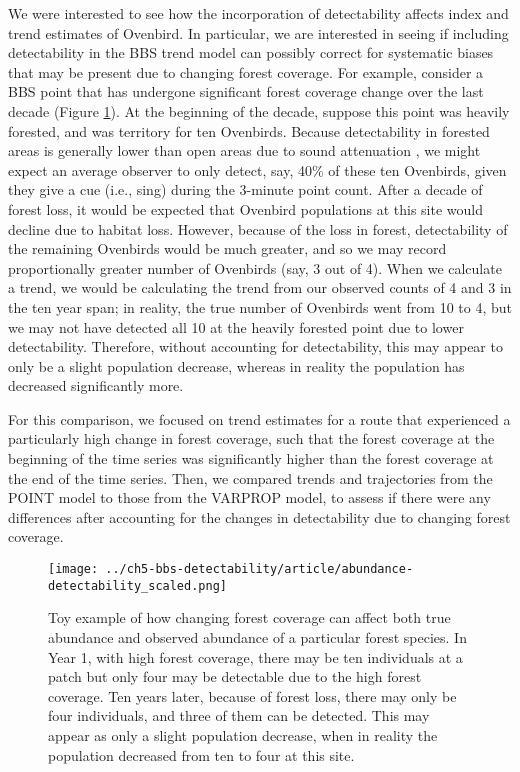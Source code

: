 \par We were interested to see how the incorporation of detectability affects index and trend estimates of Ovenbird.
In particular, we are interested in seeing if including detectability in the BBS trend model can possibly correct for systematic biases that may be present due to changing forest coverage.
For example, consider a BBS point that has undergone significant forest coverage change over the last decade (Figure \ref{fig:example}).
At the beginning of the decade, suppose this point was heavily forested, and was territory for ten Ovenbirds. 
Because detectability in forested areas is generally lower than open areas due to sound attenuation \citep{yip_sound_2017}, we might expect an average observer to only detect, say, 40\% of these ten Ovenbirds, given they give a cue (i.e., sing) during the 3-minute point count.
After a decade of forest loss, it would be expected that Ovenbird populations at this site would decline due to habitat loss.
However, because of the loss in forest, detectability of the remaining Ovenbirds would be much greater, and so we may record proportionally greater number of Ovenbirds (say, 3 out of 4).
When we calculate a trend, we would be calculating the trend from our observed counts of 4 and 3 in the ten year span; in reality, the true number of Ovenbirds went from 10 to 4, but we may not have detected all 10 at the heavily forested point due to lower detectability.
Therefore, without accounting for detectability, this may appear to only be a slight population decrease, whereas in reality the population has decreased significantly more.

\par For this comparison, we focused on trend estimates for a route that experienced a particularly high change in forest coverage, such that the forest coverage at the beginning of the time series was significantly higher than the forest coverage at the end of the time series.
Then, we compared trends and trajectories from the POINT model to those from the VARPROP model, to assess if there were any differences after accounting for the changes in detectability due to changing forest coverage.

\begin{figure}[h]
	\texttt{[image: ../ch5-bbs-detectability/article/abundance-detectability\_scaled.png]}
	\caption{Toy example of how changing forest coverage can affect both true abundance and observed abundance of a particular forest species. In Year 1, with high forest coverage, there may be ten individuals at a patch but only four may be detectable due to the high forest coverage. Ten years later, because of forest loss, there may only be four individuals, and three of them can be detected. This may appear as only a slight population decrease, when in reality the population decreased from ten to four at this site.}
	\label{fig:example}
\end{figure}

